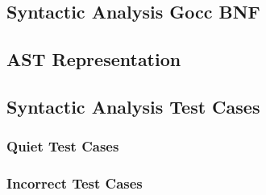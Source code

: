 \subsection{Syntactic Analysis Gocc BNF}
\label{app:parser/gocc}



\clearpage

\subsection{AST Representation}
\label{app:parser/ast_doc}



\clearpage

\subsection{Syntactic Analysis Test Cases}
\label{app:parser/testcases}

\subsubsection{Quiet Test Cases}
\label{app:parser/quiet}



\clearpage %

\subsubsection{Incorrect Test Cases}
\label{app:parser/incorrect}


